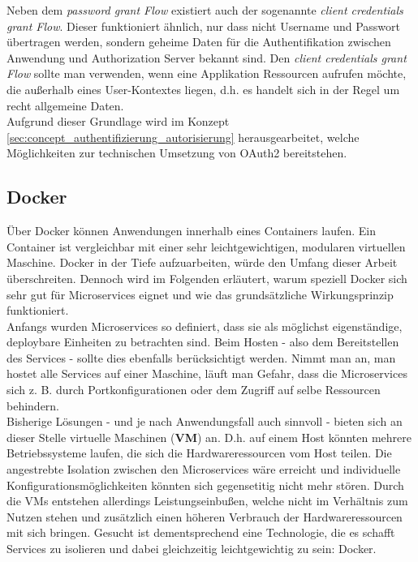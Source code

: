 Neben dem \textit{password grant Flow} existiert auch der sogenannte \textit{client credentials grant Flow}. Dieser funktioniert ähnlich, nur dass nicht Username und Passwort übertragen werden, sondern geheime Daten für die Authentifikation zwischen Anwendung und Authorization Server bekannt sind. Den \textit{client credentials grant Flow} sollte man verwenden, wenn eine Applikation Ressourcen aufrufen möchte, die außerhalb eines User-Kontextes liegen, d.h. es handelt sich in der Regel um recht allgemeine Daten.\cite{oauth2}\cite{richardson2019mic_pattern} \\

Aufgrund dieser Grundlage wird im Konzept \ref{sec:concept_authentifizierung_autorisierung} herausgearbeitet, welche Möglichkeiten zur technischen Umsetzung von OAuth2 bereitstehen. 

\subsection{Docker}

Über Docker können Anwendungen innerhalb eines Containers laufen. Ein Container ist vergleichbar mit einer sehr leichtgewichtigen, modularen virtuellen Maschine.\cite{RedHat} Docker in der Tiefe aufzuarbeiten, würde den Umfang dieser Arbeit überschreiten. Dennoch wird im Folgenden erläutert, warum speziell Docker sich sehr gut für Microservices eignet und wie das grundsätzliche Wirkungsprinzip funktioniert. \\

Anfangs wurden Microservices so definiert, dass sie als möglichst eigenständige, deploybare Einheiten zu betrachten sind. Beim Hosten - also dem Bereitstellen des Services - sollte dies ebenfalls berücksichtigt werden. Nimmt man an, man hostet alle Services auf einer Maschine, läuft man Gefahr, dass die Microservices sich z. B. durch Portkonfigurationen oder dem Zugriff auf selbe Ressourcen behindern.\cite{wolff2016mic_architectures} \\

Bisherige Lösungen - und je nach Anwendungsfall auch sinnvoll - bieten sich an dieser Stelle virtuelle Maschinen (\textbf{VM}) an. D.h. auf einem Host könnten mehrere Betriebssysteme laufen, die sich die Hardwareressourcen vom Host teilen. Die angestrebte Isolation zwischen den Microservices wäre erreicht und individuelle Konfigurationsmöglichkeiten könnten sich gegensetitig nicht mehr stören. Durch die VMs entstehen allerdings Leistungseinbußen, welche nicht im Verhältnis zum Nutzen stehen und zusätzlich einen höheren Verbrauch der Hardwareressourcen mit sich bringen.\cite{wolff2016mic_architectures} Gesucht ist dementsprechend eine Technologie, die es schafft Services zu isolieren und dabei gleichzeitig leichtgewichtig zu sein: Docker. \\

